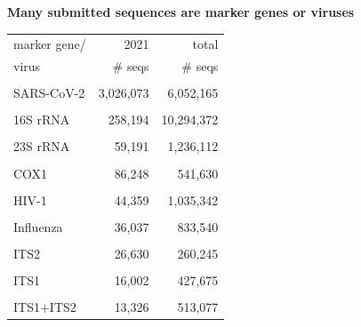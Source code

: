\documentclass[landscape]{slides}
\begin{document}
\begin{slide}
\begin{center}
\large \textbf{Many submitted sequences are marker genes or viruses}
\end{center}
\medskip

\normalsize
\begin{center}
\begin{tabular}{lrr}
 marker gene/                    &  2021    & total \\
 virus                           &  \# seqs & \# seqs   \\ \hline
& & \\                    
SARS-CoV-2                     & 3,026,073 & 6,052,165 \\
& & \\
16S rRNA                        & 258,194 & 10,294,372 \\
& & \\                    
 23S rRNA                        & 59,191  & 1,236,112  \\
& & \\
 COX1                            & 86,248  & 541,630  \\
& & \\                    
 HIV-1                           & 44,359  & 1,035,342  \\
& & \\                    
 Influenza                       & 36,037  &   833,540  \\
& & \\                    
 ITS2                            & 26,630  &   260,245  \\
& & \\                    
 ITS1                            & 16,002  &   427,675  \\
& & \\                    
 ITS1+ITS2                       & 13,326  &   513,077  \\
\end{tabular}
\end{center}
\vfill


\end{slide}
\end{document}
